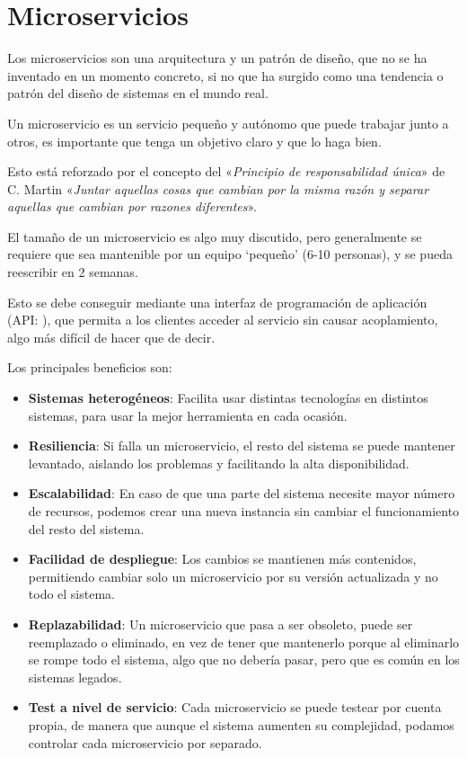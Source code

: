 \section{Microservicios}

Los microservicios son una arquitectura y un patrón de diseño, que no se ha inventado en un momento concreto, si no que ha surgido como una tendencia o patrón del diseño de sistemas en el mundo real. 

Un microservicio es un servicio pequeño y autónomo que puede trabajar junto a otros, es importante que tenga un objetivo claro y que lo haga bien.

Esto está reforzado por el concepto del «\emph{Principio de responsabilidad única}» de C. Martin\cite{martin03} «\emph{Juntar aquellas cosas que cambian por la misma razón y separar aquellas que cambian por razones diferentes}».

El tamaño de un microservicio es algo muy discutido, pero generalmente se requiere que sea mantenible por un equipo `pequeño' (6-10 personas), y se pueda reescribir en 2 semanas.

Esto se debe conseguir mediante una interfaz de programación de aplicación (API: ), que permita a los clientes acceder al servicio sin causar acoplamiento, algo más difícil de hacer que de decir.

Los principales beneficios son:
\begin{itemize}
\item \textbf{Sistemas heterogéneos}: Facilita usar distintas tecnologías en distintos sistemas, para usar la mejor herramienta en cada ocasión.
\item \textbf{Resiliencia}: Si falla un microservicio, el resto del sistema se puede mantener levantado, aislando los problemas y facilitando la alta disponibilidad.
\item \textbf{Escalabilidad}: En caso de que una parte del sistema necesite mayor número de recursos, podemos crear una nueva instancia sin cambiar el funcionamiento del resto del sistema.
\item \textbf{Facilidad de despliegue}: Los cambios se mantienen más contenidos, permitiendo cambiar solo un microservicio por su versión actualizada y no todo el sistema.
\item \textbf{Replazabilidad}: Un microservicio que pasa a ser obsoleto, puede ser reemplazado o eliminado, en vez de tener que mantenerlo porque al eliminarlo se rompe todo el sistema, algo que no debería pasar, pero que es común en los sistemas legados.
\item \textbf{Test a nivel de servicio}: Cada microservicio se puede testear por cuenta propia, de manera que aunque el sistema aumenten su complejidad, podamos controlar cada microservicio por separado.
\end{itemize}

